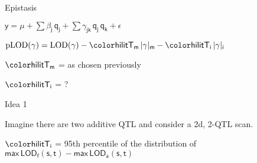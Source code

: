 \documentclass[aspectratio=169,12pt,t]{beamer}
\newcommand{\lod}{\text{LOD}}
\newcommand{\plod}{\text{pLOD}}
\begin{document}
\begin{frame}{Epistasis}

\bigskip \bigskip \bigskip

\centerline{
$\mathsf{y  = \mu + \sum \beta_j \, q_j + \sum \gamma_{jk} \, q_j \,
    q_k + \epsilon}$
}

\bigskip \bigskip \bigskip

{\hilit
$\mathsf{ \plod(\gamma) = \lod(\gamma) -
    {\hilit T_m} \, |\gamma|_m - {\hilit T_i} \, |\gamma|_i }$
}


\bigskip \bigskip \bigskip

\hspace{3em} $\mathsf{\hilit T_m}$ = as chosen previously

\bigskip

\hspace{3em} $\mathsf{\hilit T_i}$ = ?

\note{
}
\end{frame}






\begin{frame}{Idea 1}


\hfill \begin{minipage}{10in}

Imagine there are two additive QTL and consider a 2d, 2-QTL scan.

\vspace{1cm}

\hspace*{0.5in} $\mathsf{\hilit T_i}$ = 95th percentile of the
  distribution of \\[6pt]
\hspace*{1.3in} {\lolit $\mathsf{ \text{max} \, \lod_f(s,t) -
    \text{max} \, \lod_a(s,t)}$}




\end{minipage}

\note{
}
\end{frame}
\end{document}

